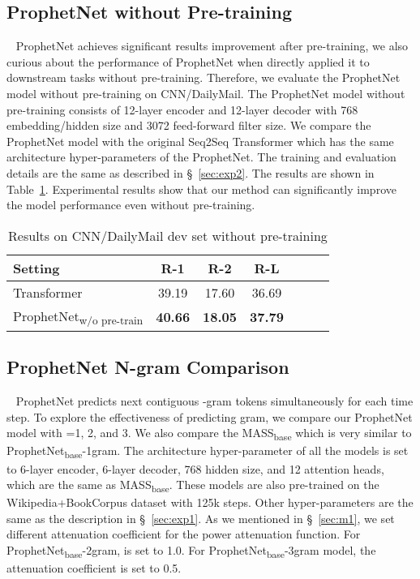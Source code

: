 \documentclass[11pt,a4paper]{article}
\begin{document}
\subsection{ProphetNet without Pre-training}~\label{sec:exp5}
ProphetNet achieves significant results improvement after pre-training, we also curious about the performance of ProphetNet when directly applied it to downstream tasks without pre-training.
Therefore, we evaluate the ProphetNet model without pre-training on CNN/DailyMail.
The ProphetNet model without pre-training consists of 12-layer encoder and 12-layer decoder with 768 embedding/hidden size and 3072 feed-forward filter size.
We compare the ProphetNet model with the original Seq2Seq Transformer which has the same architecture hyper-parameters of the ProphetNet.
The training and evaluation details are the same as described in \S~\ref{sec:exp2}.
The results are shown in Table~\ref{tab:nopretrain}.
Experimental results show that our method can significantly improve the model performance even without pre-training.
\begin{table}[h] 
\small
\begin{center}
\begin{tabular}{lcccccl}
\toprule
    Setting & R-1 & R-2 & R-L \\
    \midrule
 Transformer\scriptsize{~\cite{raffel2019exploring}} & 39.19    &17.60&   36.69\\
 ProphetNet\textsubscript{w/o pre-train} & \textbf{40.66}    & \textbf{18.05} & \textbf{37.79}\\
  \bottomrule
\end{tabular}
\end{center}
\caption{Results on CNN/DailyMail dev set without pre-training}
\label{tab:nopretrain}
\end{table}

\subsection{ProphetNet N-gram Comparison}~\label{sec:exp6}
ProphetNet predicts next contiguous -gram tokens simultaneously for each time step. To explore the effectiveness of predicting  gram, we compare our ProphetNet model with =1, 2, and 3. 
We also compare the MASS\textsubscript{base} which is very similar to ProphetNet\textsubscript{base}-1gram.  The architecture hyper-parameter of all the models is set to 6-layer encoder, 6-layer decoder, 768 hidden size, and 12 attention heads, which are the same as MASS\textsubscript{base}. These models are also pre-trained on the Wikipedia+BookCorpus dataset with 125k steps. Other hyper-parameters are the same as the description in \S~\ref{sec:exp1}. As we mentioned in \S~\ref{sec:m1}, we set different attenuation coefficient for the power attenuation function. For ProphetNet\textsubscript{base}-2gram,  is set to 1.0. For ProphetNet\textsubscript{base}-3gram model, the attenuation coefficient  is set to 0.5.
\end{document}
